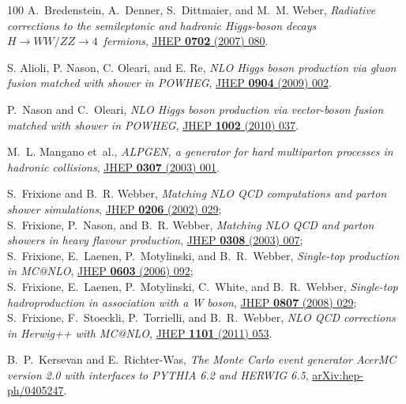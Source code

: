 \documentclass[final,3p,times,twocolumn]{elsarticle}
\begin{document}
\begin{thebibliography}{100}
A.~Bredenstein, A.~Denner, S.~Dittmaier, and M.~M. Weber, {\em {Radiative
  corrections to the semileptonic and hadronic Higgs-boson decays $H\rightarrow
  WW/ZZ\rightarrow 4$~fermions}},
  \href{http://dx.doi.org/10.1088/1126-6708/2007/02/080}{JHEP {\bfseries 0702}
  (2007) 080}.

{S. Alioli, P. Nason, C. Oleari, and E. Re}, {\em {NLO Higgs boson production
  via gluon fusion matched with shower in POWHEG}},
  \href{http://dx.doi.org/10.1088/1126-6708/2009/04/002}{JHEP {\bfseries 0904}
  (2009) 002}.

P.~Nason and C.~Oleari, {\em {NLO Higgs boson production via vector-boson
  fusion matched with shower in POWHEG}},
  \href{http://dx.doi.org/10.1007/JHEP02(2010)037}{JHEP {\bfseries 1002} (2010)
  037}.

M.~L. Mangano {et~al.}, {\em {ALPGEN, a generator for hard multiparton
  processes in hadronic collisions}},
  \href{http://dx.doi.org/10.1088/1126-6708/2003/07/001}{JHEP {\bfseries 0307}
  (2003) 001}.

S.~Frixione and B.~R. Webber, {\em {Matching NLO QCD computations and parton
  shower simulations}},
  \href{http://dx.doi.org/10.1088/1126-6708/2002/06/029}{JHEP {\bfseries 0206} (2002) 029}; \\
   S.~Frixione, P.~Nason, and B.~R. Webber, 
   {\em {Matching NLO QCD and parton showers in heavy flavour production}}, 
   \href{http://dx.doi.org/10.1088/1126-6708/2003/08/007}{JHEP {\bfseries 0308} (2003) 007}; \\
   S.~Frixione, E.~Laenen, P.~Motylinski, and B.~R.~Webber, 
   {\em {Single-top production in MC@NLO}}, 
   \href{http://dx.doi.org/10.1088/1126-6708/2006/03/092}{JHEP {\bfseries 0603} (2006) 092}; \\
   S.~Frixione, E.~Laenen, P.~Motylinski, C.~White, and B.~R.~Webber, 
   {\em {Single-top hadroproduction in association with a W boson}}, 
   \href{http://dx.doi.org/10.1088/1126-6708/2008/07/029}{JHEP {\bfseries 0807} (2008) 029}; \\
   S.~Frixione, F.~Stoeckli, P.~Torrielli, and B.~R.~Webber, 
   {\em {NLO QCD corrections in Herwig++ with MC@NLO}}, 
   \href{http://dx.doi.org/10.1007/JHEP01(2011)053}{JHEP {\bfseries 1101} (2011) 053}. 


{B.~P.~Kersevan and E.~Richter-Was}, {\em {The Monte Carlo event generator
  AcerMC version 2.0 with interfaces to PYTHIA 6.2 and HERWIG 6.5}},
\href{http://arxiv.org/abs/hep-ph/0405247}{{\ttfamily arXiv:hep-ph/0405247}}.


\end{thebibliography}
\end{document}

